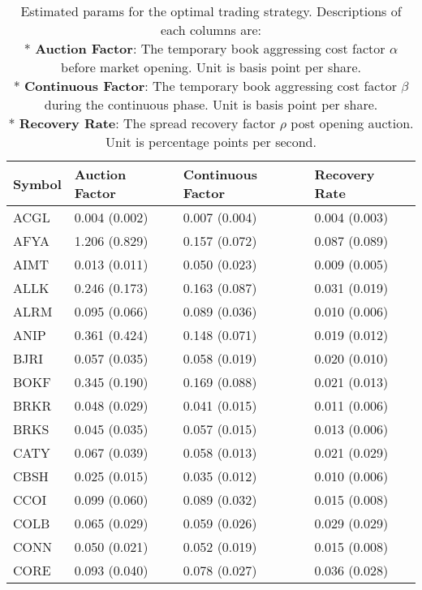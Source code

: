 \begin{table}
\centering
\caption{Estimated params for the optimal trading strategy. Descriptions of each columns are: \\
 * \textbf{Auction Factor}: The temporary book aggressing cost factor $\alpha$ before market opening. Unit is basis point per share.\\
 * \textbf{Continuous Factor}: The temporary book aggressing cost factor $\beta$ during the continuous phase. Unit is basis point per share.\\
 * \textbf{Recovery Rate}: The spread recovery factor $\rho$ post opening auction. Unit is percentage points per second.\\
}
\label{table:StockFactors}
\begin{tabular}{llll}
\toprule
Symbol & Auction Factor & Continuous Factor &  Recovery Rate \\
\midrule
  ACGL &  0.004 (0.002) &     0.007 (0.004) &  0.004 (0.003) \\
  AFYA &  1.206 (0.829) &     0.157 (0.072) &  0.087 (0.089) \\
  AIMT &  0.013 (0.011) &     0.050 (0.023) &  0.009 (0.005) \\
  ALLK &  0.246 (0.173) &     0.163 (0.087) &  0.031 (0.019) \\
  ALRM &  0.095 (0.066) &     0.089 (0.036) &  0.010 (0.006) \\
  ANIP &  0.361 (0.424) &     0.148 (0.071) &  0.019 (0.012) \\
  BJRI &  0.057 (0.035) &     0.058 (0.019) &  0.020 (0.010) \\
  BOKF &  0.345 (0.190) &     0.169 (0.088) &  0.021 (0.013) \\
  BRKR &  0.048 (0.029) &     0.041 (0.015) &  0.011 (0.006) \\
  BRKS &  0.045 (0.035) &     0.057 (0.015) &  0.013 (0.006) \\
  CATY &  0.067 (0.039) &     0.058 (0.013) &  0.021 (0.029) \\
  CBSH &  0.025 (0.015) &     0.035 (0.012) &  0.010 (0.006) \\
  CCOI &  0.099 (0.060) &     0.089 (0.032) &  0.015 (0.008) \\
  COLB &  0.065 (0.029) &     0.059 (0.026) &  0.029 (0.029) \\
  CONN &  0.050 (0.021) &     0.052 (0.019) &  0.015 (0.008) \\
  CORE &  0.093 (0.040) &     0.078 (0.027) &  0.036 (0.028) \\

\end{tabular}
\end{table}
